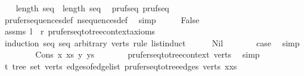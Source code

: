 \begin{isabellebody}
\ \ \isamarkupfalse%
\ {\isachardoublequoteopen}length\ seq{}\ {\isacharequal}{\kern0pt}\ length\ seq{}{\isachardoublequoteclose}\ \isamarkupfalse%
\ pruf{\isacharunderscore}{\kern0pt}seq{}\ pruf{\isacharunderscore}{\kern0pt}seq{}\ \isamarkupfalse%
\ prufer{\isacharunderscore}{\kern0pt}sequences{\isacharunderscore}{\kern0pt}def\ n{\isacharunderscore}{\kern0pt}sequences{\isacharunderscore}{\kern0pt}def\ \isamarkupfalse%
\ simp\isanewline
\ \ \isamarkupfalse%
\ \isamarkupfalse%
\ False\isanewline
\ \ \ \ \isamarkupfalse%
\ assms\ {\isacartoucheopen}{\isacharquery}{\kern0pt}l\ {\isacharequal}{\kern0pt}\ {\isacharquery}{\kern0pt}r{\isacartoucheclose}\ prufer{\isacharunderscore}{\kern0pt}seq{\isacharunderscore}{\kern0pt}to{\isacharunderscore}{\kern0pt}tree{\isacharunderscore}{\kern0pt}context{\isacharunderscore}{\kern0pt}axioms\isanewline
\ \ \isamarkupfalse%
\ {\isacharparenleft}{\kern0pt}induction\ seq{}\ seq{}\ arbitrary{\isacharcolon}{\kern0pt}\ verts\ rule{\isacharcolon}{\kern0pt}\ list{\isacharunderscore}{\kern0pt}induct{}{\isacharparenright}{\kern0pt}\isanewline
\ \ \ \ \isamarkupfalse%
\ Nil\isanewline
\ \ \ \ \isamarkupfalse%
\ \isamarkupfalse%
\ {\isacharquery}{\kern0pt}case\ \isamarkupfalse%
\ simp\isanewline
\ \ \isamarkupfalse%
\isanewline
\ \ \ \ \isamarkupfalse%
\ {\isacharparenleft}{\kern0pt}Cons\ x\ xs\ y\ ys{\isacharparenright}{\kern0pt}\isanewline
\ \ \ \ \isamarkupfalse%
\ \isamarkupfalse%
\ prufer{\isacharunderscore}{\kern0pt}seq{\isacharunderscore}{\kern0pt}to{\isacharunderscore}{\kern0pt}tree{\isacharunderscore}{\kern0pt}context\ verts\ \isamarkupfalse%
\ simp\isanewline
\ \ \ \ \isamarkupfalse%
\ t{}{\isacharcolon}{\kern0pt}\ tree\ {\isachardoublequoteopen}set\ verts{\isachardoublequoteclose}\ {\isachardoublequoteopen}edges{\isacharunderscore}{\kern0pt}of{\isacharunderscore}{\kern0pt}edge{\isacharunderscore}{\kern0pt}list\ {\isacharparenleft}{\kern0pt}prufer{\isacharunderscore}{\kern0pt}seq{\isacharunderscore}{\kern0pt}to{\isacharunderscore}{\kern0pt}tree{\isacharunderscore}{\kern0pt}edges\ verts\ {\isacharparenleft}{\kern0pt}x{\isacharhash}{\kern0pt}xs{\isacharparenright}{\kern0pt}{\isacharparenright}{\kern0pt}{\isachardoublequoteclose}\ \isamarkupfalse%

\end{isabellebody}
